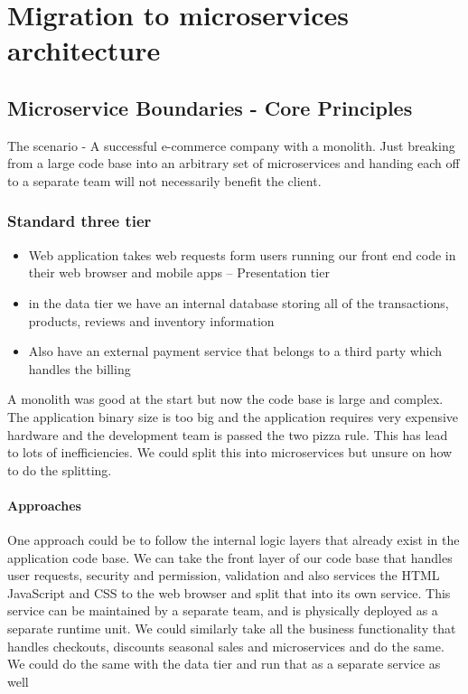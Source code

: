 \documentclass[a4paper, 11pt]{book}
\begin{document}
    \section{Migration to microservices architecture}

    \subsection{Microservice Boundaries - Core Principles}
    The scenario - A successful e-commerce company with a monolith.
    Just breaking from a large code base into an arbitrary set of microservices and handing each off to a separate team will not necessarily benefit the client.

    \subsubsection{Standard three tier}
    \begin{itemize}
        \item Web application takes web requests form users running our front end code in their web browser and mobile apps -- Presentation tier
        \item in the data tier we have an internal database storing all of the transactions, products, reviews and inventory information
        \item Also have an external payment service that belongs to a third party which handles the billing
    \end{itemize}

    A monolith was good at the start but now the code base is large and complex.
    The application binary size is too big and the application requires very expensive hardware and the development team is passed the two pizza rule.
    This has lead to lots of inefficiencies.
    We could split this into microservices but unsure on how to do the splitting.

    \paragraph{Approaches}
    One approach could be to follow the internal logic layers that already exist in the application code base.
    We can take the front layer of our code base that handles user requests, security and permission, validation and also services the HTML JavaScript and CSS to the web browser and split that into its own service.
    This service can be maintained by a separate team, and is physically deployed as a separate runtime unit.
    We could similarly take all the business functionality that handles checkouts, discounts seasonal sales and microservices and do the same.
    We could do the same with the data tier and run that as a separate service as well
\end{document}
